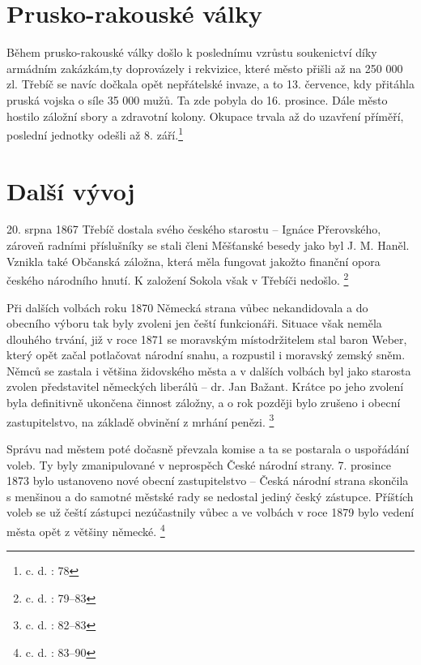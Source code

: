 \documentclass[a4paper,oneside,12p]{report}
\begin{document}
\section{Prusko-rakouské války}

Během prusko-rakouské války došlo k poslednímu vzrůstu soukenictví díky armádním zakázkám,ty doprovázely i rekvizice, které město přišli až na 250 000 zl.
Třebíč se navíc dočkala opět nepřátelské invaze, a to 13. července, kdy přitáhla pruská vojska o síle 35 000 mužů.
Ta zde pobyla do 16. prosince.
Dále město hostilo záložní sbory a zdravotní kolony.
Okupace trvala až do uzavření příměří, poslední jednotky odešli až 8. září.\footnote{c. d. : 78}

\section{Další vývoj}

20. srpna 1867 Třebíč dostala svého českého starostu -- Ignáce Přerovského, zároveň radními příslušníky se stali členi Měšťanské besedy jako byl J. M. Haněl.
Vznikla také Občanská záložna, která měla fungovat jakožto finanční opora českého národního hnutí.
K založení Sokola však v Třebíči nedošlo. \footnote{c. d. : 79--83}

Při dalších volbách roku 1870 Německá strana vůbec nekandidovala a do obecního výboru tak byly zvoleni jen čeští funkcionáři.
Situace však neměla dlouhého trvání, již v roce 1871 se moravským místodržitelem stal baron Weber, který opět začal potlačovat národní snahu, a rozpustil i moravský zemský sněm.
Němců se zastala i většina židovského města a v dalších volbách byl jako starosta zvolen představitel německých liberálů -- dr. Jan Bažant.
Krátce po jeho zvolení byla definitivně ukončena činnost záložny, a o rok později bylo zrušeno i obecní zastupitelstvo, na základě obvinění z mrhání penězi. \footnote{c. d. : 82--83}

Správu nad městem poté dočasně převzala komise a ta se postarala o uspořádání voleb.
Ty byly zmanipulované v neprospěch České národní strany.
7. prosince 1873 bylo ustanoveno nové obecní zastupitelstvo -- Česká národní strana skončila s menšinou a do samotné městské rady se nedostal jediný český zástupce.
Příštích voleb se už čeští zástupci nezúčastnily vůbec a ve volbách v roce 1879 bylo vedení města opět z většiny německé. \footnote{c. d. : 83--90}

\end{document}
